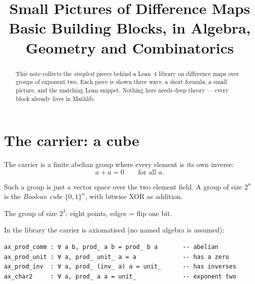 \documentclass[11pt]{article}
\title{\bf Small Pictures of Difference Maps\\[2pt]
  \large Basic Building Blocks, in Algebra, Geometry and Combinatorics}
\author{}
\date{}
\begin{document}
\maketitle

\begin{abstract}\noindent
This note collects the \emph{simplest} pieces behind a Lean~4 library on
difference maps over groups of exponent two.  Each piece is shown three ways:
a short formula, a small picture, and the matching Lean snippet.  Nothing here
needs deep theory --- every block already lives in Mathlib.
\end{abstract}

\bigskip

\section{The carrier: a cube}

The carrier is a finite abelian group where every element is its own inverse:
\[
  a + a = 0 \qquad\text{for all } a .
\]

Such a group is just a vector space over the two element field.  A group of size
$2^n$ is the \emph{Boolean cube} $\{0,1\}^n$, with bitwise XOR as addition.

\begin{center}

{\small The group of size $2^3$: eight points, edges = flip one bit.}
\end{center}

In the library the carrier is axiomatised (no named algebra is assumed):

\begin{lstlisting}
ax_prod_comm : ∀ a b, prod_ a b = prod_ b a       -- abelian
ax_prod_unit : ∀ a, prod_ unit_ a = a             -- has a zero
ax_prod_inv  : ∀ a, prod_ (inv_ a) a = unit_      -- has inverses
ax_char2     : ∀ a, prod_ a a = unit_             -- exponent two
\end{lstlisting}
\end{document}
